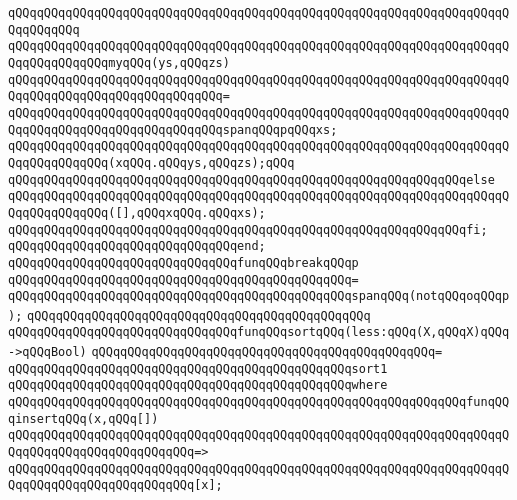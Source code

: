 \verb|qQQqqQQqqQQqqQQqqQQqqQQqqQQqqQQqqQQqqQQqqQQqqQQqqQQqqQQqqQQqqQQqqQQqqQQqqQQqqQQq|\newline
\verb|qQQqqQQqqQQqqQQqqQQqqQQqqQQqqQQqqQQqqQQqqQQqqQQqqQQqqQQqqQQqqQQqqQQqqQQqqQQqqQQqqQQqmyqQQq(ys,qQQqzs)|\newline
\verb|qQQqqQQqqQQqqQQqqQQqqQQqqQQqqQQqqQQqqQQqqQQqqQQqqQQqqQQqqQQqqQQqqQQqqQQqqQQqqQQqqQQqqQQqqQQqqQQqqQQq=|\newline
\verb|qQQqqQQqqQQqqQQqqQQqqQQqqQQqqQQqqQQqqQQqqQQqqQQqqQQqqQQqqQQqqQQqqQQqqQQqqQQqqQQqqQQqqQQqqQQqqQQqqQQqspanqQQqpqQQqxs;|\newline
\newline
\verb|qQQqqQQqqQQqqQQqqQQqqQQqqQQqqQQqqQQqqQQqqQQqqQQqqQQqqQQqqQQqqQQqqQQqqQQqqQQqqQQqqQQq(xqQQq.qQQqys,qQQqzs);qQQq|\newline
\verb|qQQqqQQqqQQqqQQqqQQqqQQqqQQqqQQqqQQqqQQqqQQqqQQqqQQqqQQqqQQqqQQqelse|\newline
\verb|qQQqqQQqqQQqqQQqqQQqqQQqqQQqqQQqqQQqqQQqqQQqqQQqqQQqqQQqqQQqqQQqqQQqqQQqqQQqqQQqqQQq([],qQQqxqQQq.qQQqxs);|\newline
\verb|qQQqqQQqqQQqqQQqqQQqqQQqqQQqqQQqqQQqqQQqqQQqqQQqqQQqqQQqqQQqqQQqfi;|\newline
\verb|qQQqqQQqqQQqqQQqqQQqqQQqqQQqqQQqend;|\newline
\newline
\verb|qQQqqQQqqQQqqQQqqQQqqQQqqQQqqQQqfunqQQqbreakqQQqp|\newline
\verb|qQQqqQQqqQQqqQQqqQQqqQQqqQQqqQQqqQQqqQQqqQQqqQQq=|\newline
\verb|qQQqqQQqqQQqqQQqqQQqqQQqqQQqqQQqqQQqqQQqqQQqqQQqspanqQQq(notqQQqoqQQqp);|\newline
\verb|qQQqqQQqqQQqqQQqqQQqqQQqqQQqqQQqqQQqqQQqqQQqqQQq|\newline
\verb|qQQqqQQqqQQqqQQqqQQqqQQqqQQqqQQqfunqQQqsortqQQq(less:qQQq(X,qQQqX)qQQq->qQQqBool)|\newline
\verb|qQQqqQQqqQQqqQQqqQQqqQQqqQQqqQQqqQQqqQQqqQQqqQQq=|\newline
\verb|qQQqqQQqqQQqqQQqqQQqqQQqqQQqqQQqqQQqqQQqqQQqqQQqsort1|\newline
\verb|qQQqqQQqqQQqqQQqqQQqqQQqqQQqqQQqqQQqqQQqqQQqqQQqwhere|\newline
\verb|qQQqqQQqqQQqqQQqqQQqqQQqqQQqqQQqqQQqqQQqqQQqqQQqqQQqqQQqqQQqqQQqfunqQQqinsertqQQq(x,qQQq[])|\newline
\verb|qQQqqQQqqQQqqQQqqQQqqQQqqQQqqQQqqQQqqQQqqQQqqQQqqQQqqQQqqQQqqQQqqQQqqQQqqQQqqQQqqQQqqQQqqQQqqQQq=>|\newline
\verb|qQQqqQQqqQQqqQQqqQQqqQQqqQQqqQQqqQQqqQQqqQQqqQQqqQQqqQQqqQQqqQQqqQQqqQQqqQQqqQQqqQQqqQQqqQQqqQQq[x];|\newline
